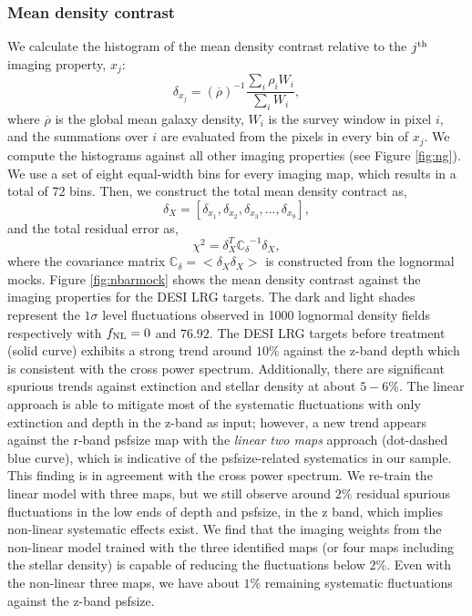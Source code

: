 \subsubsection{Mean density contrast}
We calculate the histogram of the mean density contrast relative to the $j^{\rm th}$ imaging property, $x_{j}$:
\begin{equation}
\delta_{x_{j}} = ({\overline{\rho}})^{-1} \frac{\sum_{i} \rho_{i} W_{i}}{\sum_{i} W_{i}},
\end{equation}
where $\overline{\rho}$ is the global mean galaxy density, $W_{i}$ is the survey window in pixel $i$, and the summations over $i$ are evaluated from the pixels in every bin of $x_{j}$. We compute the histograms against all other imaging properties (see Figure \ref{fig:ng}). We use a set of eight equal-width bins for every imaging map, which results in a total of 72 bins. Then, we construct the total mean density contract as,
\begin{equation}
\delta_{X} = [\delta_{x_{1}}, \delta_{x_{2}}, \delta_{x_{3}}, ..., \delta_{x_{9}}],
\end{equation}
and the total residual error as,
\begin{equation}
\chi^{2} = \delta_{X}^{T} \mathbb{C_{\delta}}^{-1} \delta_{X},
\end{equation}
where the covariance matrix $\mathbb{C}_{\delta} = < \delta_{X} \delta_{X}>$ is constructed from the lognormal mocks. Figure \ref{fig:nbarmock} shows the mean density contrast against the imaging properties for the DESI LRG targets. The dark and light shades represent the $1\sigma$ level fluctuations observed in 1000 lognormal density fields respectively with $f_{\rm NL}=0$ and $76.92$. The DESI LRG targets before treatment (solid curve) exhibits a strong trend around $10\%$ against the z-band depth which is consistent with the cross power spectrum. Additionally, there are significant spurious trends against extinction and stellar density at about $5-6\%$. The linear approach is able to mitigate most of the systematic fluctuations with only extinction and depth in the z-band as input; however,  a new trend appears against the r-band psfsize map with the \textit{linear two maps} approach (dot-dashed blue curve), which is indicative of the psfsize-related systematics in our sample. This finding is in agreement with the cross power spectrum. We re-train the linear model with three maps, but we still observe around $2\%$ residual spurious fluctuations in the low ends of depth and psfsize, in the z band, which implies non-linear systematic effects exist. We find that the imaging weights from the non-linear model trained with the three identified maps (or four maps including the stellar density) is capable of reducing the fluctuations below $2\%$. Even with the non-linear three maps, we have about $1\%$ remaining systematic fluctuations against the z-band psfsize. 


